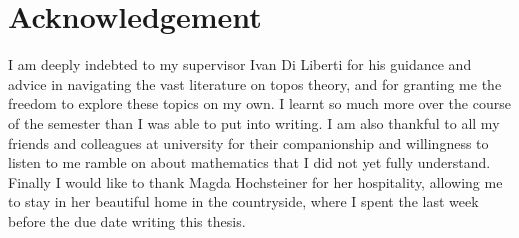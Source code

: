 \nocite{*}
\begin{titlingpage}
	\maketitle
	
\end{titlingpage}

\section*{Acknowledgement}
I am deeply indebted to my supervisor Ivan Di Liberti for his guidance and advice in navigating the vast literature on topos theory, and for granting me the freedom to explore these topics on my own. I learnt so much more over the course of the semester than I was able to put into writing. I am also thankful to all my friends and colleagues at university for their companionship and willingness to listen to me ramble on about mathematics that I did not yet fully understand. Finally I would like to thank Magda Hochsteiner for her hospitality, allowing me to stay in her beautiful home in the countryside, where I spent the last week before the due date writing this thesis.

\newpage

\begin{KeepFromToc}
	\tableofcontents
\end{KeepFromToc}
